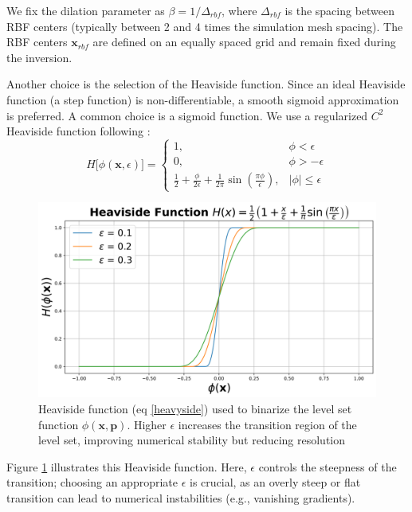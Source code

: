\documentclass{segabs}
\begin{document}
We fix the dilation parameter as $\beta = 1/\Delta_{rbf}$, where $\Delta_{rbf}$ is the spacing between RBF centers (typically between 2 and 4 times the simulation mesh spacing). The RBF centers $\mathbf{x}_{rbf}$ are defined on an equally spaced grid and remain fixed during the inversion.

Another choice is the selection of the Heaviside function. Since an ideal Heaviside function (a step function) is non-differentiable, a smooth sigmoid approximation is preferred. A common choice is a sigmoid function. We use a regularized ${C^2}$ Heaviside function following \cite{aghasi_parametric_2011}:
\begin{equation}\label{heavyside}
H\big[\phi(\mathbf{x},\epsilon)\big] = \begin{cases}
	1, & \phi<\epsilon \\
	0, & \phi>-\epsilon\\
        \frac{1}{2} + \frac{\phi}{2\epsilon}+ \frac{1}{2\pi}\sin(\frac{\pi \phi}{\epsilon}), & |\phi| \leq \epsilon
\end{cases}
\end{equation}

\begin{figure}[h]
    \centering
    \includegraphics[width=\columnwidth]{figures/heaviside.png}
    \caption{Heaviside function (eq \ref{heavyside}) used to binarize the level set function $\phi(\mathbf{x}, \mathbf{p})$. Higher $\epsilon$ increases the transition region of the level set, improving numerical stability but reducing resolution}
    \label{fig:heaviside}
\end{figure}

Figure \ref{fig:heaviside} illustrates this Heaviside function. Here, $\epsilon$ controls the steepness of the transition; choosing an appropriate $\epsilon$ is crucial, as an overly steep or flat transition can lead to numerical instabilities (e.g., vanishing gradients). 
\end{document}
